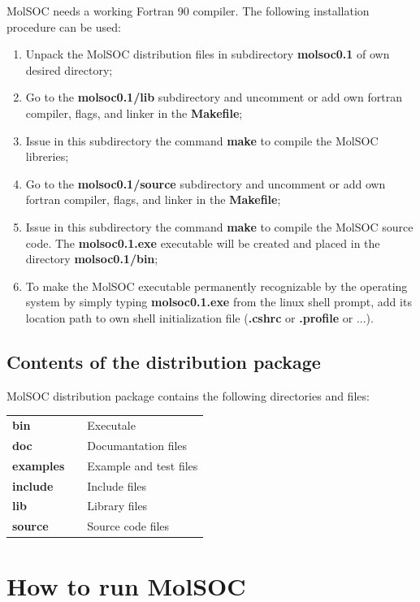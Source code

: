 \documentclass[a4paper,12pt]{article}
\begin{document}
{\sf MolSOC} needs a working Fortran 90 compiler. The 
following installation procedure can be used:
\begin{enumerate}
\item Unpack the {\sf MolSOC} distribution files in subdirectory {\bf molsoc0.1} of own desired directory;
\item Go to the {\bf molsoc0.1/lib} subdirectory and uncomment or add own fortran compiler, flags, and linker in the {\bf Makefile};
\item Issue in this subdirectory the command {\bf make} to compile the {\sf MolSOC} libreries;
\item Go to the {\bf molsoc0.1/source} subdirectory and uncomment or add own fortran compiler, flags, and linker in the {\bf Makefile};
\item Issue in this subdirectory the command {\bf make} to compile the {\sf MolSOC} source code. The {\bf molsoc0.1.exe} executable will be created and placed in the directory {\bf molsoc0.1/bin};
\item To make the {\sf MolSOC} executable permanently recognizable by the operating system 
by simply typing {\bf molsoc0.1.exe} from the linux shell prompt, add its location path to 
own shell initialization file ({\bf .cshrc} or {\bf .profile} or ...).
\end{enumerate}

\subsection{Contents of the distribution package}

{\sf MolSOC} distribution package contains the following directories and files:
\begin{table}[ht]
\begin{tabular}{lll}
{\bf bin}      &    &  Executale                  \\
{\bf doc}      &    &  Documantation files        \\
{\bf examples} &    &  Example and test files     \\
{\bf include}  &    &  Include files              \\
{\bf lib}      &    &  Library files              \\
{\bf source}   &    &  Source code files          \\
\end{tabular}
\end{table}

\section{How to run {\sf MolSOC}}
\end{document}
